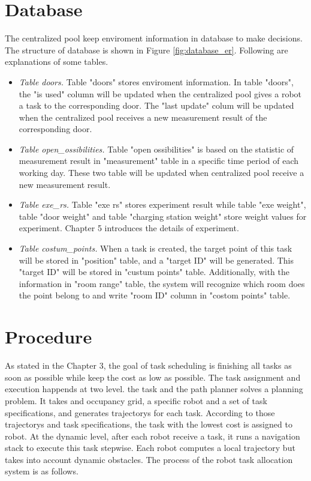 \section{Database}
The centralized pool keep enviroment information in database to make decisions. The structure of database is shown in Figure \ref{fig:database_er}. Following are explanations of some tables.
\begin{itemize}
    \item \textsl{Table doors.} Table "doors" stores enviroment information. In table "doors", the "is used" column will be updated when the centralized pool gives a robot a task to the corresponding door. The "last update" colum will be updated when the centralized pool receives a new measurement result of the corresponding door. 
	\item \textsl{Table open\_ossibilities.} Table "open ossibilities" is based on the statistic of measurement result in "measurement" table in a specific time period of each working day. These two table will be updated when centralized pool receive a new measurement result. 
	\item \textsl{Table exe\_rs.} Table "exe rs" stores experiment result while table "exe weight", table "door weight" and table "charging station weight" store weight values for experiment. Chapter 5 introduces the details of experiment.
	\item \textsl{Table costum\_points.} When a task is created, the target point of this task will be stored in "position" table, and a "target ID" will be generated.  This "target ID" will be stored in "custum points" table. Additionally, with the information in "room range" table, the system will recognize which room does the point belong to and write "room ID" column in "costom points" table.
\end{itemize}


\section{Procedure}
As stated in the Chapter 3, the goal of task scheduling is finishing all tasks as soon as possible while keep the cost as low as possible. 
The task assignment and execution happends at two level. \cite{Ivan2017} the task and the path planner solves a planning problem. It takes and occupancy grid, a specific robot and a set of task specifications, and generates trajectorys for each task. According to those trajectorys and task specifications, the task with the lowest cost is assigned to robot.
At the dynamic level, after each robot receive a task, it runs a navigation stack to execute this task stepwise. Each robot computes a local trajectory but takes into account dynamic obstacles.
The process of the robot task allocation system is as follows.


